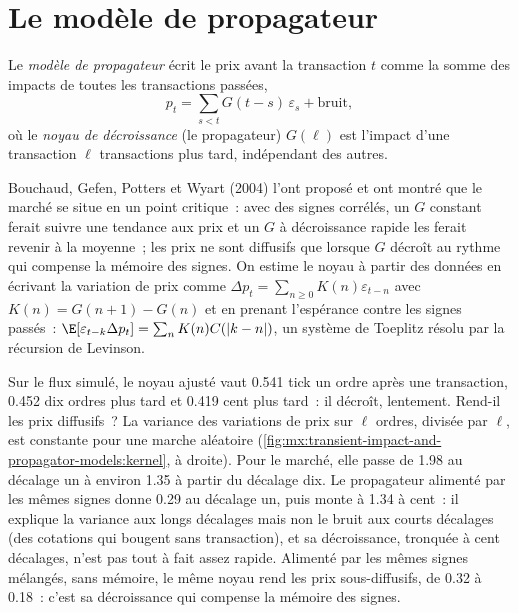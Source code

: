 \section{Le modèle de propagateur}

\begin{definition}\label{def:mx:transient-impact-and-propagator-models:propagator}
Le \emph{modèle de propagateur} écrit le prix avant la transaction $t$ comme la somme des impacts de toutes les transactions passées,
\[
p_t=\sum_{s<t}G(t-s)\,\varepsilon_s+\text{bruit},
\]
où le \emph{noyau de décroissance} (le propagateur) $G(\ell)$ est l'impact d'une transaction $\ell$ transactions plus tard, indépendant des autres.
\end{definition}

Bouchaud, Gefen, Potters et Wyart (2004) l'ont proposé et ont montré que le marché se situe en un point critique~: avec des signes corrélés, un $G$ constant ferait
suivre une tendance aux prix et un $G$ à décroissance rapide les ferait revenir à la moyenne~; les prix ne sont diffusifs que lorsque $G$ décroît au rythme qui compense la mémoire des signes.
On estime le noyau à partir des données en écrivant la variation de prix comme $\Delta p_t=\sum_{n\ge0}K(n)\varepsilon_{t-n}$ avec $K(n)=G(n+1)-G(n)$ et en prenant
l'espérance contre les signes passés~: $\E[\varepsilon_{t-k}\Delta p_t]=\sum_nK(n)C(|k-n|)$, un système de Toeplitz résolu par la récursion de Levinson.

\label{lst:mx:transient-impact-and-propagator-models:fit}

Sur le flux simulé, le noyau ajusté vaut 0.541 tick un ordre après une transaction, 0.452 dix ordres plus tard et 0.419 cent plus tard~: il décroît, lentement. Rend-il
les prix diffusifs~? La variance des variations de prix sur $\ell$ ordres, divisée par $\ell$, est constante pour une marche aléatoire
(\cref{fig:mx:transient-impact-and-propagator-models:kernel}, à droite). Pour le marché, elle passe de 1.98 au décalage un à environ 1.35 à partir du décalage dix. Le
propagateur alimenté par les mêmes signes donne 0.29 au décalage un, puis monte à 1.34 à cent~: il explique la variance aux longs décalages mais non le bruit aux courts décalages
(des cotations qui bougent sans transaction), et sa décroissance, tronquée à cent décalages, n'est pas tout à fait assez rapide. Alimenté par les mêmes signes mélangés, sans mémoire, le
même noyau rend les prix sous-diffusifs, de 0.32 à 0.18~: c'est sa décroissance qui compense la mémoire des signes.

